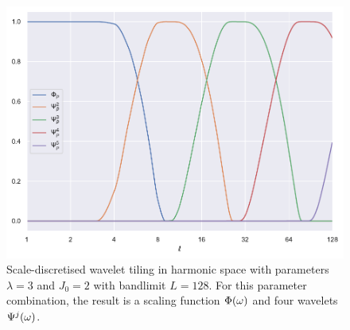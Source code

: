 \begin{figure}[htpb]
	\centering\capstart{}
	\includegraphics[width=\textwidth]{axisymmetric_tiling_L128.pdf}
	\caption[
		The tiling of the harmonic line used in scale-discretised wavelets
	]{
		Scale-discretised wavelet tiling in harmonic space with parameters \(\lambda=3\) and \(J_{0}=2\) with bandlimit \(L=128\).
		For this parameter combination, the result is a scaling function \(\Phi(\omega)\) and four wavelets \(\Psi^{j}(\omega)\).
	}\label{fig:chapter2_tiling}
\end{figure}
